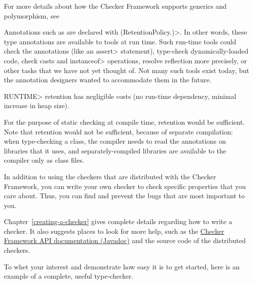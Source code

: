 For more details about how the Checker Framework supports generics and
polymorphism, see 



Annotations such as  are
declared with
\<(RetentionPolicy.)>.  In other words,
these type annotations are available to tools at run time.  Such run-time
tools could check the annotations (like an \<assert> statement), type-check
dynamically-loaded code, check casts and \<instanceof> operations, resolve
reflection more precisely, or other tasks that we have not yet thought of.
Not many such tools exist today, but the annotation designers wanted to
accommodate them in the future.

\<RUNTIME> retention has negligible costs (no run-time dependency, minimal
increase in heap size).

For the purpose of static checking at compile time,
retention would be sufficient.  Note that
retention would not be sufficient, because of separate compilation: when
type-checking a class, the compiler needs to read the annotations on
libraries that it uses, and separately-compiled libraries are available to
the compiler only as class files.




In addition to using the checkers that are distributed with the Checker
Framework, you can write your own checker to check specific properties that
you care about.  Thus, you can find and prevent the bugs that are most
important to you.

Chapter~\ref{creating-a-checker} gives
complete details regarding how to write a checker.  It also suggests places
to look for more help, such as the \href{../api/}{Checker Framework
API documentation (Javadoc)} and the source code of the distributed
checkers.

To whet your interest and demonstrate how easy it is to get started, here
is an example of a complete, useful type-checker.

